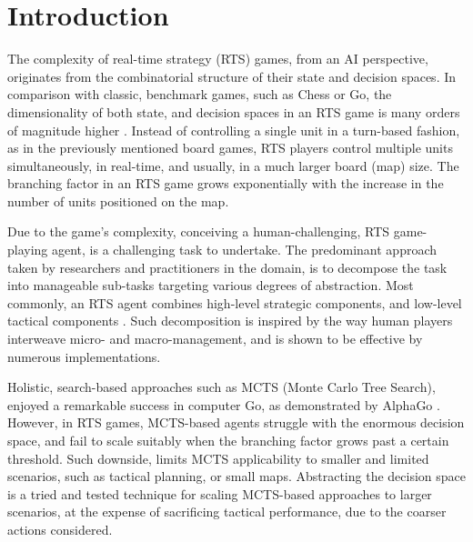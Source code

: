 \documentclass[conference]{IEEEtran}
\begin{document}
\begin{IEEEkeywords}

\end{IEEEkeywords}



\section{Introduction}
\label{sec:introduction}

The complexity of real-time strategy (RTS) games, from an AI perspective, originates from the combinatorial structure of their state and decision spaces. In comparison with classic, benchmark games, such as Chess or Go, the dimensionality of both state, and decision spaces in an RTS game is many orders of magnitude higher \cite{ontanon_survey_2013}. Instead of controlling a single unit in a turn-based fashion, as in the previously mentioned board games, RTS players control multiple units simultaneously, in real-time, and usually, in a much larger board (map) size. The branching factor in an RTS game grows exponentially with the increase in the number of units positioned on the map.

Due to the game's complexity, conceiving a human-challenging, RTS game-playing agent, is a challenging task to undertake. The predominant approach taken by researchers and practitioners in the domain, is to decompose the task into manageable sub-tasks targeting various degrees of abstraction. Most commonly, an RTS agent combines high-level strategic components, and low-level tactical components \cite{barriga_combining_2017}. Such decomposition is inspired by the way human players interweave micro- and macro-management, and is shown to be effective by numerous implementations.

Holistic, search-based approaches such as MCTS (Monte Carlo Tree Search), enjoyed a remarkable success in computer Go, as demonstrated by AlphaGo \cite{silver_mastering_2016}. However, in RTS games, MCTS-based agents struggle with the enormous decision space, and fail to scale suitably when the branching factor grows past a certain threshold. Such downside, limits MCTS applicability to smaller and limited scenarios, such as tactical planning, or small maps. Abstracting the decision space is a tried and tested technique for scaling MCTS-based approaches to larger scenarios, at the expense of sacrificing tactical performance, due to the coarser actions considered.
\end{document}
